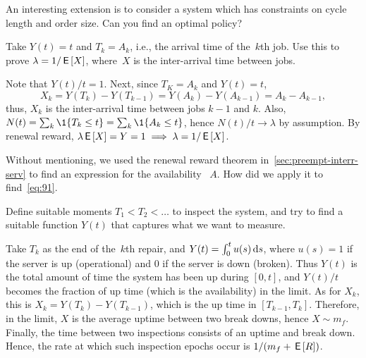 \documentclass[queueing-book.tex]{subfiles}
\begin{document}
An interesting extension is to consider a system which has  constraints on cycle length and order size. Can you find an optimal policy?



\begin{exercise}
Take $Y(t)=t$ and $T_{k} = A_{k}$, i.e., the arrival time of the~$k$th job. Use this to prove $\lambda = 1/\,\mathsf{E}\left[X\right]$, where~$X$ is the inter-arrival time between jobs.
\begin{solution}
Note that  $Y(t)/t = 1$. Next, since $T_K=A_{k}$ and $Y(t)=t$,
\begin{equation*}
X_k = Y(T_k) -Y(T_{k-1}) = Y(A_k) - Y(A_{k-1})  = A_k - A_{k-1},
\end{equation*}
thus,  $X_{k}$ is the inter-arrival time between jobs $k-1$ and  $k$. Also, $N(t) = \sum_k \1{T_k\leq t} = \sum_{k} \1{A_{k}\leq t}$, hence $N(t)/t \to \lambda$ by assumption.  By renewal reward, $\lambda \,\mathsf{E}\left[X\right] = Y = 1 \implies \lambda=1/ \,\mathsf{E}\left[X\right]$.
\end{solution}
\end{exercise}

\begin{exercise}
Without mentioning, we used the renewal reward theorem in~\cref{sec:preempt-interr-serv} to find an expression for the availability ~$A$.
How did we apply it to find~\cref{eq:91}.
\begin{hint}
Define suitable moments $T_{1} < T_{2} < \ldots$ to inspect the system, and try to find a suitable function $Y(t)$ that captures what we want to measure.
\end{hint}

\begin{solution}
Take $T_{k}$ as the end of the~$k$th repair, and $Y(t) = \int_0^{t} u(s) \,\textrm{d}s$, where $u(s) = 1$ if the server is up (operational) and 0 if the server is down (broken).
Thus $Y(t)$ is the total amount of time the system has been up during $[0,t]$, and $Y(t)/t$ becomes the fraction of up time (which is the availability) in the limit.
As for $X_{k}$, this is $X_k = Y(T_k)-Y(T_{k-1})$, which is the up time in $[T_{k-1}, T_{k}]$.
Therefore, in the limit, $X$ is the average uptime between two break downs, hence $X \sim m_{f}$.
Finally, the time between two inspections consists of an uptime and break down. Hence, the rate at which such inspection epochs occur is $1/(m_{f}+\,\mathsf{E}\left[R\right])$.
\end{solution}
\end{exercise}
\end{document}

